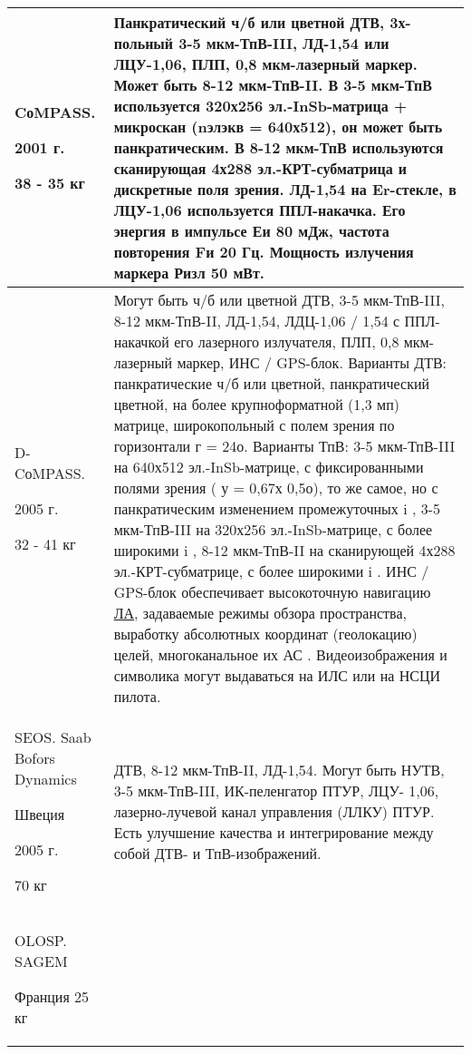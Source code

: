 \begin{landscape}
\begin{longtable}{| p{6cm} | p{18cm} |}
	\\ \hline
		CоMPASS.		
		
		2001 г. 	
		
		38 - 35 кг 
& 
Панкратический ч/б или цветной ДТВ, 3х-польный 3-5 мкм-ТпВ-III, ЛД-1,54 или ЛЦУ-1,06, ПЛП, 0,8 
мкм-лазерный маркер. Может быть 8-12 мкм-ТпВ-II. В 3-5 мкм-ТпВ используется 320х256 эл.-InSb-матрица + микроскан (nэлэкв = 640х512), он может быть 
панкратическим. В 8-12 мкм-ТпВ используются сканирующая 4х288 эл.-КРТ-субматрица и дискретные 
поля зрения. ЛД-1,54 на Er-стекле, в ЛЦУ-1,06 используется ППЛ-накачка. Его энергия в импульсе Еи 80 мДж, частота повторения Fи 20 Гц. Мощность излучения маркера Ризл 50 мВт. 
 
\\ \hline
		D-CоMPASS.
				
		2005 г. 
			
		32 - 41 кг 
& 
Могут быть ч/б или цветной ДТВ, 3-5 мкм-ТпВ-III, 8-12 мкм-ТпВ-II, ЛД-1,54, ЛДЦ-1,06 / 1,54 с ППЛ- 
накачкой его лазерного излучателя, ПЛП, 0,8 мкм-лазерный маркер, ИНС / GPS-блок. 
Варианты ДТВ: 
панкратические ч/б или цветной, панкратический цветной, на более крупноформатной (1,3 мп) матрице, широкопольный с полем зрения по горизонтали г = 24о. 
Варианты ТпВ: 
3-5 мкм-ТпВ-III на 640х512 эл.-InSb-матрице, с фиксированными полями зрения ( у = 0,67х 0,5о), то же самое, но с панкратическим изменением промежуточных i , 3-5 мкм-ТпВ-III на 320х256 эл.-InSb-матрице, с более широкими i , 8-12 мкм-ТпВ-II на сканирующей 4х288 эл.-КРТ-субматрице, с более широкими i . 
ИНС / GPS-блок обеспечивает высокоточную навигацию  \hyperref[acroLA]{ЛА}, задаваемые режимы обзора пространства, выработку абсолютных координат (геолокацию) целей, многоканальное их АС 
. Видеоизображения и символика могут выдаваться на ИЛС или на НСЦИ пилота. 
 
\\ \hline
	SEOS. Saab Bofors Dynamics \cite[]{doi:10.1117/12.450557}
	
	Швеция	
	
	2005 г. 	
	
	70 кг	 
& 
ДТВ, 8-12 мкм-ТпВ-II, ЛД-1,54. Могут быть НУТВ, 3-5 мкм-ТпВ-III, ИК-пеленгатор ПТУР, ЛЦУ-
1,06, лазерно-лучевой канал управления (ЛЛКУ) ПТУР.
Есть улучшение качества и интегрирование между собой ДТВ- и ТпВ-изображений.
 
\\ \hline
		OLOSP. SAGEM
		\cite[]{sagem-olosp}
		
		Франция		25 кг
		 

\end{longtable}
\end{landscape}
